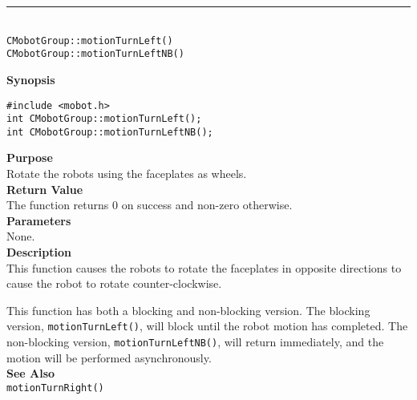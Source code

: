 \noindent
\vspace{5pt}
\rule{4.5in}{0.015in}\\
\noindent
{\LARGE \texttt{CMobotGroup::motionTurnLeft()}}\\
{\LARGE \texttt{CMobotGroup::motionTurnLeftNB()}}\\
{}

\noindent
{\bf Synopsis}\\
\begin{verbatim}
#include <mobot.h>
int CMobotGroup::motionTurnLeft();
int CMobotGroup::motionTurnLeftNB();
\end{verbatim}

\noindent
{\bf Purpose}\\
Rotate the robots using the faceplates as wheels.\\

\noindent
{\bf Return Value}\\
The function returns 0 on success and non-zero otherwise.\\

\noindent
{\bf Parameters}\\
None.\\

\noindent
{\bf Description}\\
This function causes the robots to rotate the faceplates in opposite directions
to cause the robot to rotate counter-clockwise.

This function has both a blocking and non-blocking version.
The blocking version, \texttt{motionTurnLeft()}, will block until the
robot motion has completed. The non-blocking version, \texttt{motionTurnLeftNB()},
will return immediately, and the motion will be performed asynchronously.\\


\noindent
{\bf See Also}\\
\texttt{motionTurnRight()}

